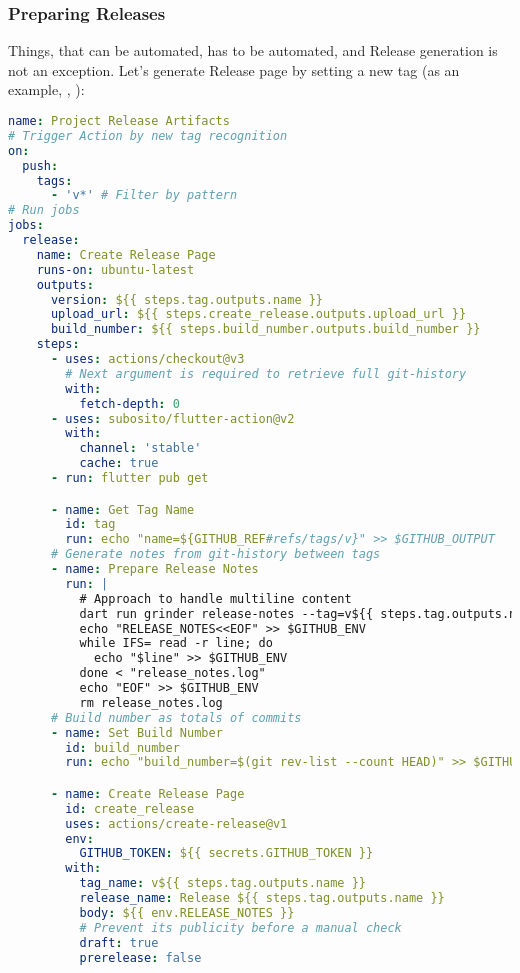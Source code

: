 \subsubsection{Preparing Releases}

Things, that can be automated, has to be automated, and Release generation is not an exception. Let's generate Release
page by setting a new tag (as an example, , ):

\begin{lstlisting}[language=yaml]
name: Project Release Artifacts
# Trigger Action by new tag recognition
on:
  push:
    tags:
      - 'v*' # Filter by pattern
# Run jobs
jobs:
  release:
    name: Create Release Page
    runs-on: ubuntu-latest
    outputs:
      version: ${{ steps.tag.outputs.name }}
      upload_url: ${{ steps.create_release.outputs.upload_url }}
      build_number: ${{ steps.build_number.outputs.build_number }}
    steps:
      - uses: actions/checkout@v3
        # Next argument is required to retrieve full git-history
        with:
          fetch-depth: 0
      - uses: subosito/flutter-action@v2
        with:
          channel: 'stable'
          cache: true
      - run: flutter pub get

      - name: Get Tag Name
        id: tag
        run: echo "name=${GITHUB_REF#refs/tags/v}" >> $GITHUB_OUTPUT
      # Generate notes from git-history between tags
      - name: Prepare Release Notes
        run: |
          # Approach to handle multiline content 
          dart run grinder release-notes --tag=v${{ steps.tag.outputs.name }} --output=release_notes.log
          echo "RELEASE_NOTES<<EOF" >> $GITHUB_ENV
          while IFS= read -r line; do
            echo "$line" >> $GITHUB_ENV
          done < "release_notes.log"
          echo "EOF" >> $GITHUB_ENV
          rm release_notes.log
      # Build number as totals of commits
      - name: Set Build Number
        id: build_number
        run: echo "build_number=$(git rev-list --count HEAD)" >> $GITHUB_OUTPUT

      - name: Create Release Page
        id: create_release
        uses: actions/create-release@v1
        env:
          GITHUB_TOKEN: ${{ secrets.GITHUB_TOKEN }}
        with:
          tag_name: v${{ steps.tag.outputs.name }}
          release_name: Release ${{ steps.tag.outputs.name }}
          body: ${{ env.RELEASE_NOTES }}
          # Prevent its publicity before a manual check
          draft: true
          prerelease: false
\end{lstlisting}


